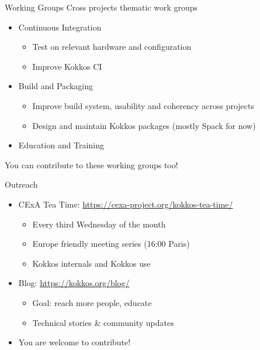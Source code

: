 
\begin{frame}{Working Groups}
    Cross projects thematic work groups

    \begin{itemize}
        \item Continuous Integration
        \begin{itemize}
            \item Test on relevant hardware and configuration
            \item Improve Kokkos CI
        \end{itemize}
        \item Build and Packaging
        \begin{itemize}
            \item Improve build system, usability and coherency across projects
            \item Design and maintain Kokkos packages (mostly Spack for now)
        \end{itemize}
        \item Education and Training
    \end{itemize}

    You can contribute to these working groups too!
\end{frame}


\begin{frame}{Outreach}
    \begin{itemize}
        \item CExA Tea Time: \url{https://cexa-project.org/kokkos-tea-time/}
        \begin{itemize}
            \item Every third Wednesday of the month
            \item Europe friendly meeting series (16:00 Paris)
            \item Kokkos internals and Kokkos use
        \end{itemize}
        \item Blog: \url{https://kokkos.org/blog/}
        \begin{itemize}
            \item Goal: reach more people, educate
            \item Technical stories \& community updates
        \end{itemize}
        \item You are welcome to contribute! 
    \end{itemize}
\end{frame}


